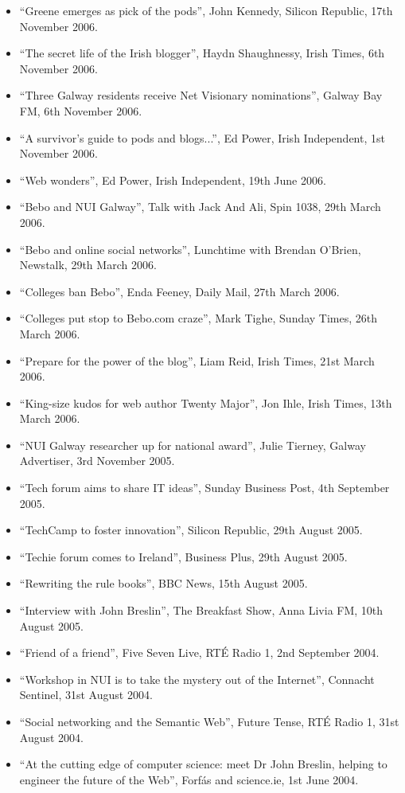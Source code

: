 \documentclass[10pt,a4paper]{res} %
\begin{document}
\begin{resume}
{\begin{itemize}
\item ``Greene emerges as pick of the pods'', John Kennedy, Silicon Republic, 17th November 2006.
\item ``The secret life of the Irish blogger'', Haydn Shaughnessy, Irish Times, 6th November 2006.
\item ``Three Galway residents receive Net Visionary nominations'', Galway Bay FM, 6th November 2006.
\item ``A survivor's guide to pods and blogs...'', Ed Power, Irish Independent, 1st November 2006.
\item ``Web wonders'', Ed Power, Irish Independent, 19th June 2006.
\item ``Bebo and NUI Galway'', Talk with Jack And Ali, Spin 1038, 29th March 2006.
\item ``Bebo and online social networks'', Lunchtime with Brendan O'Brien, Newstalk, 29th March 2006.
\item ``Colleges ban Bebo'', Enda Feeney, Daily Mail, 27th March 2006.
\item ``Colleges put stop to Bebo.com craze'', Mark Tighe, Sunday Times, 26th March 2006.
\item ``Prepare for the power of the blog'', Liam Reid, Irish Times, 21st March 2006.
\item ``King-size kudos for web author Twenty Major'', Jon Ihle, Irish Times, 13th March 2006.
\item ``NUI Galway researcher up for national award'', Julie Tierney, Galway Advertiser, 3rd November 2005.
\item ``Tech forum aims to share IT ideas'', Sunday Business Post, 4th September 2005.
\item ``TechCamp to foster innovation'', Silicon Republic, 29th August 2005.
\item ``Techie forum comes to Ireland'', Business Plus, 29th August 2005.
\item ``Rewriting the rule books'', BBC News, 15th August 2005.
\item ``Interview with John Breslin'', The Breakfast Show, Anna Livia FM, 10th August 2005.
\item ``Friend of a friend'', Five Seven Live, RT\'{E} Radio 1, 2nd September 2004.
\item ``Workshop in NUI is to take the mystery out of the Internet'', Connacht Sentinel, 31st August 2004.
\item ``Social networking and the Semantic Web'', Future Tense, RT\'{E} Radio 1, 31st August 2004.
\item ``At the cutting edge of computer science: meet Dr John Breslin, helping to engineer the future of the Web'', Forf\'{a}s and science.ie, 1st June 2004.
\end{itemize}

}
\end{resume}
\end{document}
